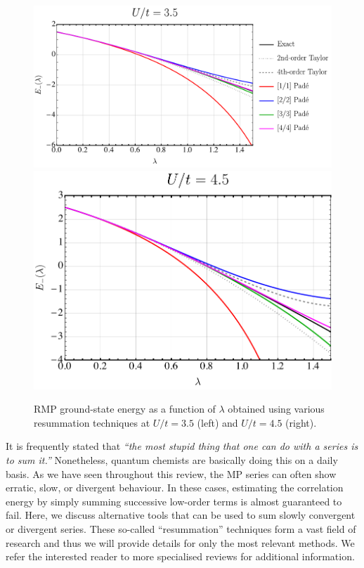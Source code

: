 \documentclass[aps,prb,reprint,noshowkeys,superscriptaddress]{revtex4-1}
\begin{document}
\begin{figure}
    \includegraphics[height=0.23\textheight]{fig9a}
    \includegraphics[height=0.23\textheight]{fig9b}
    \caption{\label{fig:PadeRMP}
    RMP ground-state energy as a function of $\lambda$ obtained using various resummation 
    techniques at $U/t = 3.5$ (left) and $U/t = 4.5$ (right).}
\end{figure}


It is frequently stated that
\textit{``the most stupid thing that one can do with a series is to sum it.''}
Nonetheless, quantum chemists are basically doing this on a daily basis.
As we have seen throughout this review, the MP series can often show erratic, 
slow, or divergent behaviour.
In these cases, estimating the correlation energy by simply summing successive
low-order terms is almost guaranteed to fail.
Here, we discuss alternative tools that can be used to sum slowly convergent or divergent series.
These so-called ``resummation'' techniques form a vast field of research and thus we will
provide details for only the most relevant methods.
We refer the interested reader to more specialised reviews for additional information.%
\cite{Goodson_2011,Goodson_2019}
\end{document}
